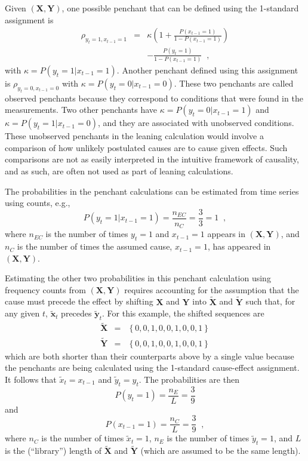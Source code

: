 Given $(\mathbf{X},\mathbf{Y})$, one possible penchant that can be defined using the 1-standard assignment is
\begin{eqnarray*}
\rho_{y_{t}=1,x_{t-1}=1} &=& \kappa \left(1+\frac{P\left(x_{t-1} = 1\right)}{1-P\left(x_{t-1} = 1\right)}\right)\\
& & -\frac{P\left(y_{t} = 1\right)}{1-P\left(x_{t-1} = 1\right)}\;\;,
\end{eqnarray*}
with $\kappa = P\left( y_t = 1 | x_{t-1} = 1\right)$.  Another penchant defined using this assignment is $\rho_{y_t=0,x_{t-1}=0}$ with  $\kappa = P\left( y_t = 0 | x_{t-1} = 0\right)$.  These two penchants are called observed penchants because they correspond to conditions that were found in the measurements.  Two other penchants have $\kappa = P\left( y_t = 0 | x_{t-1} = 1\right)$ and $\kappa = P\left( y_t = 1 | x_{t-1} = 0\right)$, and they are associated with unobserved conditions.  These unobserved penchants in the leaning calculation would involve a comparison of how unlikely postulated causes are to cause given effects.  Such comparisons are not as easily interpreted in the intuitive framework of causality, and as such, are often not used as part of leaning calculations. 

The probabilities in the penchant calculations can be estimated from time series using counts, e.g.,\
$$
P\left( y_t = 1 | x_{t-1} = 1\right) = \frac{n_{EC}}{n_C} = \frac{3}{3} = 1\;\;,
$$
where $n_{EC}$ is the number of times $y_t=1$ and $x_{t-1}=1$ appears in $(\mathbf{X},\mathbf{Y})$, and $n_{C}$ is the number of times the assumed cause, $x_{t-1}=1$, has appeared in $(\mathbf{X},\mathbf{Y})$.  

Estimating the other two probabilities in this penchant calculation using frequency counts from $(\mathbf{X},\mathbf{Y})$ requires accounting for the assumption that the cause must precede the effect by shifting $\mathbf{X}$ and $\mathbf{Y}$ into $\tilde{\mathbf{X}}$ and $\tilde{\mathbf{Y}}$ such that, for any given $t$, $\tilde{\mathbf{x}}_t$ precedes $\tilde{\mathbf{y}}_t$.  For this example, the shifted sequences are
\begin{eqnarray*}
\tilde{\mathbf{X}} &=& \left\{0,0,1,0,0,1,0,0,1\right\}\\
\tilde{\mathbf{Y}} &=& \left\{0,0,1,0,0,1,0,0,1\right\}
\end{eqnarray*}
which are both shorter than their counterparts above by a single value because the penchants are being calculated using the 1-standard cause-effect assignment. It follows that $\tilde{x}_t = x_{t-1}$ and $\tilde{y}_t=y_t$.  The probabilities are then
\begin{equation}
P\left( y_t = 1\right) = \frac{n_E}{L} = \frac{3}{9}
\end{equation}
and
\begin{equation}
P\left( x_{t-1} = 1\right) = \frac{n_C}{L} = \frac{3}{9}\;\;,
\end{equation}
where $n_C$ is the number of times $\tilde{x}_t = 1$, $n_E$ is the number of times $\tilde{y}_t = 1$, and $L$ is the (``library'') length of $\tilde{\mathbf{X}}$ and $\tilde{\mathbf{Y}}$ (which are assumed to be the same length).  

